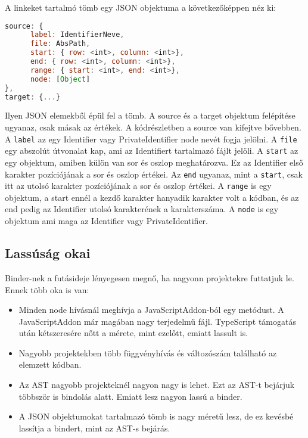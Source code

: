 A linkeket tartalmó tömb egy JSON objektuma a következőképpen néz ki:

\begin{lstlisting}[caption={Binder JSON objektuma}, label={lst:binder_json_arg}, language={JavaScript}]
source: {
      label: IdentifierNeve,
      file: AbsPath,
      start: { row: <int>, column: <int>},
      end: { row: <int>, column: <int>},
      range: { start: <int>, end: <int>},
      node: [Object]
},
target: {...}
\end{lstlisting}

Ilyen JSON elemekből épül fel a tömb.
A source és a target objektum felépítése ugyanaz, csak másak az értékek.
A kódrészletben a source van kifejtve bővebben.
A \texttt{label} az egy Identifier vagy PrivateIdentifier node nevét fogja jelölni.
A \texttt{file} egy abszolút útvonalat kap, ami az Identifiert tartalmazó fájlt jelöli.
A \texttt{start} az egy objektum, amiben külön van sor és oszlop meghatározva. Ez az Identifier első karakter pozíciójának a sor és oszlop értékei.
Az \texttt{end} ugyanaz, mint a \texttt{start}, csak itt az utolsó karakter pozíciójának a sor és oszlop értékei.
A \texttt{range} is egy objektum, a start ennél a kezdő karakter hanyadik karakter volt a kódban, és az end pedig az Identifier utolsó karakterének a karakterszáma.
A \texttt{node} is egy objektum ami maga az Identifier vagy PrivateIdentifier.

\subsection{Lassúság okai}

Binder-nek a futásideje lényegesen megnő, ha nagyonn projektekre futtatjuk le.
Ennek több oka is van:

\begin{itemize}
      \item Minden node hívásnál meghívja a JavaScriptAddon-ból egy metódust.
      A JavaScriptAddon már magában nagy terjedelmű fájl. TypeScript támogatás után kétszeresére nőtt a mérete, mint ezelőtt, emiatt lassult is.
      \item Nagyobb projektekben több függvényhívás és változószám található az elemzett kódban.
      \item Az AST nagyobb projekteknél nagyon nagy is lehet.
      Ezt az AST-t bejárjuk többször is bindolás alatt. Emiatt lesz nagyon lassú a binder.
      \item A JSON objektumokat tartalmazó tömb is nagy méretű lesz, de ez kevésbé lassítja a bindert, mint az AST-s bejárás.
\end{itemize}

